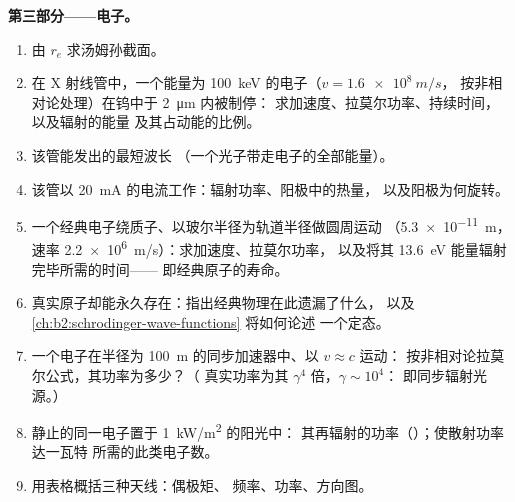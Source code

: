 \begin{problem}
\medskip
\noindent\textbf{第三部分——电子。}
\begin{enumerate}[resume]
  \item 由 $r_e$ 求汤姆孙截面。
  \item 在 X 射线管中，一个能量为 \qty{100}{keV} 的电子（$v = \qty{1.6e8}{m/s}$，
        按非相对论处理）在钨中于 \qty{2}{\micro m} 内被制停：
        求加速度、拉莫尔功率、持续时间，以及辐射的能量
        及其占动能的比例。
  \item 该管能发出的最短波长
        （一个光子带走电子的全部能量）。
  \item 该管以 \qty{20}{mA} 的电流工作：辐射功率、阳极中的热量，
        以及阳极为何旋转。
  \item 一个经典电子绕质子、以玻尔半径为轨道半径做圆周运动
        （\qty{5.3e-11}{m}，速率 \qty{2.2e6}{m/s}）：求加速度、拉莫尔功率，
        以及将其 \qty{13.6}{eV} 能量辐射完毕所需的时间——
        即经典原子的寿命。
  \item 真实原子却能永久存在：指出经典物理在此遗漏了什么，
        以及 \cref{ch:b2:schrodinger-wave-functions} 将如何论述
        一个定态。
  \item 一个电子在半径为 \qty{100}{m} 的同步加速器中、以 $v \approx c$ 运动：
        按非相对论拉莫尔公式，其功率为多少？（
        真实功率为其 $\gamma^4$ 倍，$\gamma \sim 10^4$：
        即同步辐射光源。）
  \item 静止的同一电子置于 \qty{1}{kW/m^2} 的阳光中：
        其再辐射的功率（）；使散射功率达一瓦特
        所需的此类电子数。
  \item 用表格概括三种天线：偶极矩、
        频率、功率、方向图。
\end{enumerate}
\end{problem}
